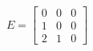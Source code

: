\documentclass[preview]{standalone}
\begin{document}
\begin{align*}
E = \begin{bmatrix} 0 & 0 & 0 \\ 1 & 0 & 0 \\ 2 & 1 & 0 \end{bmatrix}
\end{align*}
\end{document}
